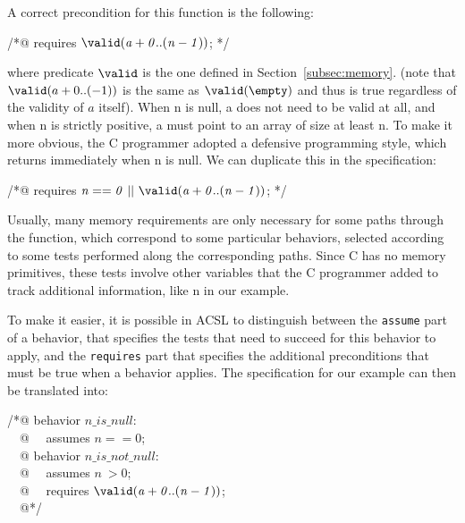 \noindent
A correct precondition for this function is the following:

\begin{flushleft}\ttfamily
/*@ requires $\mathit{\texttt{{\textbackslash}valid}(a + 0..(n-1))}$; */
\end{flushleft}

where predicate $\texttt{{\textbackslash}valid}$ is the one defined in Section~\ref{subsec:memory}.
(note that $\texttt{{\textbackslash}valid}(a + 0..(-1))$ is the same as
$\valid(\verb+\empty+)$ and thus is true regardless of the validity of
$a$ itself).
When {\ttfamily n} is null, {\ttfamily a} does
not need to be valid at all, and when {\ttfamily n} is strictly
positive, {\ttfamily a} must point to an array of size at least
{\ttfamily n}.  To make it more obvious, the C programmer adopted a
defensive programming style, which returns immediately when {\ttfamily n} is
null. We can duplicate this in the specification:

\begin{flushleft}\ttfamily
/*@ requires $\mathit{n == 0 ~||~ \texttt{{\textbackslash}valid}(a + 0..(n-1))}$; */
\end{flushleft}

Usually, many memory requirements are only necessary for some paths
through the function, which correspond to some particular
behaviors, selected according to some tests performed along the
corresponding paths. Since C has no memory
primitives, these tests involve other variables that the C programmer
added to track additional information, like {\ttfamily n} in our example.

To make it easier, it is possible in ACSL to distinguish between the
\verb|assume| part of a behavior, that specifies the tests that need
to succeed for this behavior to apply, and the \verb|requires| part
that specifies the additional preconditions that must be true when a
behavior applies. The specification for our example can then be
translated into:

\begin{flushleft}\ttfamily
/*@ behavior $\mathit{n\_is\_null}$: \\
~~@ ~~assumes $\mathit{n == 0}$; \\
~~@ behavior $\mathit{n\_is\_not\_null}$: \\
~~@ ~~assumes $\mathit{n ~> 0}$; \\
~~@ ~~requires $\mathit{\texttt{{\textbackslash}valid}(a + 0..(n-1))}$; \\
~~@*/
\end{flushleft}

